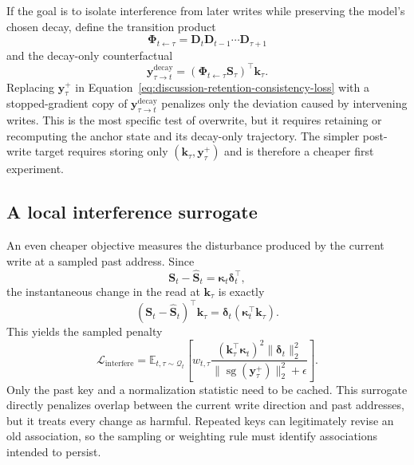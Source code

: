 \documentclass[11pt]{article}
\newcommand{\vct}[1]{\boldsymbol{#1}}
\begin{document}
If the goal is to isolate interference from later writes while preserving the model's chosen
decay, define the transition product
\begin{equation}
  \vct{\Phi}_{t\leftarrow\tau}
  =\vct{D}_t\vct{D}_{t-1}\cdots\vct{D}_{\tau+1}
  \label{eq:discussion-replay-transition-product}
\end{equation}
and the decay-only counterfactual
\begin{equation}
  \vct{y}^{\mathrm{decay}}_{\tau\to t}
  =\left(
    \vct{\Phi}_{t\leftarrow\tau}\vct{S}_\tau
  \right)^\top\vct{k}_\tau.
  \label{eq:discussion-replay-decay-only-target}
\end{equation}
Replacing $\vct{y}_\tau^+$ in
Equation~\eqref{eq:discussion-retention-consistency-loss} with a stopped-gradient copy of
$\vct{y}^{\mathrm{decay}}_{\tau\to t}$ penalizes only the deviation caused by intervening writes.
This is the most specific test of overwrite, but it requires retaining or recomputing the anchor
state and its decay-only trajectory. The simpler post-write target requires storing only
$(\vct{k}_\tau,\vct{y}_\tau^+)$ and is therefore a cheaper first experiment.

\subsection{A local interference surrogate}

An even cheaper objective measures the disturbance produced by the current write at a sampled
past address. Since
\begin{equation}
  \vct{S}_t-\widehat{\vct{S}}_t
  =\vct{\kappa}_t\vct{\delta}_t^\top,
\end{equation}
the instantaneous change in the read at $\vct{k}_\tau$ is exactly
\begin{equation}
  (\vct{S}_t-\widehat{\vct{S}}_t)^\top\vct{k}_\tau
  =\vct{\delta}_t
    (\vct{\kappa}_t^\top\vct{k}_\tau).
  \label{eq:discussion-instantaneous-interference}
\end{equation}
This yields the sampled penalty
\begin{equation}
  \mathcal{L}_{\mathrm{interfere}}
  =\mathbb{E}_{t,\tau\sim\mathcal{Q}_t}\!\left[
    w_{t,\tau}
    \frac{
      (\vct{k}_\tau^\top\vct{\kappa}_t)^2
      \|\vct{\delta}_t\|_2^2
    }{
      \|\operatorname{sg}(\vct{y}_\tau^+)\|_2^2+\epsilon
    }
  \right].
  \label{eq:discussion-instantaneous-interference-loss}
\end{equation}
Only the past key and a normalization statistic need to be cached. This surrogate directly
penalizes overlap between the current write direction and past addresses, but it treats every
change as harmful. Repeated keys can legitimately revise an old association, so the sampling or
weighting rule must identify associations intended to persist.
\end{document}
